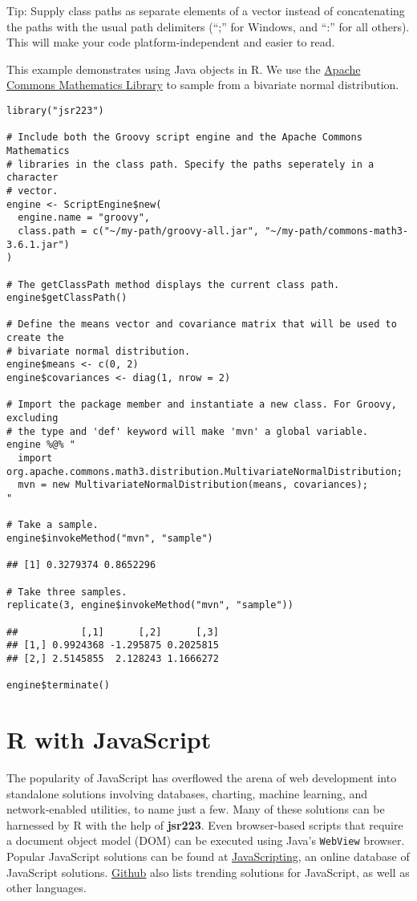\documentclass[
article,
11pt, %
a4paper, %
oneside, %
headinclude,footinclude, %
]{scrartcl}
\theoremstyle{definition} %
\theoremstyle{plain} %
\theoremstyle{remark} %
\newcommand{\pkg}[1]{\textbf{#1}}
\newcommand{\code}[1]{\texttt{#1}}
\newcommand{\strong}[1]{\texorpdfstring{{\normalfont\fontseries{b}\selectfont #1}}{#1}}
\begin{document}
\strong{Tip:} Supply class paths as separate elements of a vector instead of concatenating the paths with the usual path delimiters (“;” for Windows, and “:” for all others). This will make your code platform-independent and easier to read.

This example demonstrates using Java objects in R. We use the \href{http://commons.apache.org/proper/commons-math/}{Apache Commons Mathematics Library} to sample from a bivariate normal distribution. %

\begin{verbatim}
library("jsr223")

# Include both the Groovy script engine and the Apache Commons Mathematics
# libraries in the class path. Specify the paths seperately in a character
# vector.
engine <- ScriptEngine$new(
  engine.name = "groovy",
  class.path = c("~/my-path/groovy-all.jar", "~/my-path/commons-math3-3.6.1.jar")
)

# The getClassPath method displays the current class path.
engine$getClassPath()

# Define the means vector and covariance matrix that will be used to create the
# bivariate normal distribution.
engine$means <- c(0, 2)
engine$covariances <- diag(1, nrow = 2)

# Import the package member and instantiate a new class. For Groovy, excluding
# the type and 'def' keyword will make 'mvn' a global variable.
engine %@% "
  import org.apache.commons.math3.distribution.MultivariateNormalDistribution;
  mvn = new MultivariateNormalDistribution(means, covariances);
"

# Take a sample.
engine$invokeMethod("mvn", "sample")

## [1] 0.3279374 0.8652296

# Take three samples.
replicate(3, engine$invokeMethod("mvn", "sample"))

##           [,1]      [,2]      [,3]
## [1,] 0.9924368 -1.295875 0.2025815
## [2,] 2.5145855  2.128243 1.1666272

engine$terminate()
\end{verbatim}

\hypertarget{r-with-javascript}{}
\section{R with JavaScript}

The popularity of JavaScript has overflowed the arena of web development into standalone solutions involving databases, charting, machine learning, and network-enabled utilities, to name just a few. Many of these solutions can be harnessed by R with the help of \pkg{jsr223}. Even browser-based scripts that require a document object model (DOM) can be executed using Java's \code{WebView} browser. Popular JavaScript solutions can be found at \href{https://www.javascripting.com/}{JavaScripting}, an online database of JavaScript solutions. \href{https://github.com/trending/javascript?since=monthly}{Github} also lists trending solutions for JavaScript, as well as other languages.
\end{document}
